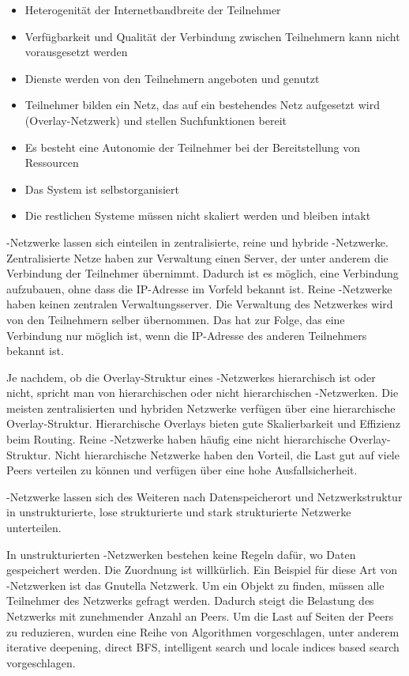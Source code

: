 \begin{itemize}
  \item Heterogenität der Internetbandbreite der Teilnehmer
  \item Verfügbarkeit und Qualität der Verbindung zwischen Teilnehmern kann nicht vorausgesetzt werden
  \item Dienste werden von den Teilnehmern angeboten und genutzt
  \item Teilnehmer bilden ein Netz, das auf ein bestehendes Netz aufgesetzt wird (Overlay-Netzwerk) und stellen Suchfunktionen bereit
  \item Es besteht eine Autonomie der Teilnehmer bei der Bereitstellung von Ressourcen
  \item Das System ist selbstorganisiert
  \item Die restlichen Systeme müssen nicht skaliert werden und bleiben intakt
\end{itemize}
\pTp-Netzwerke lassen sich einteilen in zentralisierte, reine und hybride \pTp-Netzwerke. Zentralisierte Netze haben zur Verwaltung einen Server, der unter anderem die Verbindung der Teilnehmer übernimmt. Dadurch ist es möglich, eine Verbindung aufzubauen, ohne dass die IP-Adresse im Vorfeld bekannt ist. Reine \pTp-Netzwerke haben keinen zentralen Verwaltungsserver. Die Verwaltung des Netzwerkes wird von den Teilnehmern selber übernommen. Das hat zur Folge, das eine Verbindung nur möglich ist, wenn die IP-Adresse des anderen Teilnehmers bekannt ist. 

Je nachdem, ob die Overlay-Struktur eines \pTp-Netzwerkes hierarchisch ist oder nicht, spricht man von hierarchischen oder nicht hierarchischen \pTp-Netzwerken. Die meisten zentralisierten und hybriden Netzwerke verfügen über eine hierarchische Overlay-Struktur. Hierarchische Overlays bieten gute Skalierbarkeit und Effizienz beim Routing. Reine \pTp-Netzwerke haben häufig eine nicht hierarchische Overlay-Struktur. Nicht hierarchische Netzwerke haben den Vorteil, die Last gut auf viele Peers verteilen zu können und verfügen über eine hohe Ausfallsicherheit.\cite{searchingsurvey}

\pTp-Netzwerke lassen sich des Weiteren nach Datenspeicherort und Netzwerkstruktur in unstrukturierte, lose strukturierte und stark strukturierte Netzwerke unterteilen. \cite{searchingsurvey}

In unstrukturierten \pTp-Netzwerken bestehen keine Regeln dafür, wo Daten gespeichert werden. Die Zuordnung ist willkürlich. Ein Beispiel für diese Art von \pTp-Netzwerken ist das Gnutella Netzwerk.\cite{gnutella} Um ein Objekt zu finden, müssen alle Teilnehmer des Netzwerks gefragt werden. Dadurch steigt die Belastung des Netzwerks mit zunehmender Anzahl an Peers. Um die Last auf Seiten der Peers zu reduzieren, wurden eine Reihe von Algorithmen vorgeschlagen, unter anderem iterative deepening\cite{deepening}, direct BFS\cite{deepening}, intelligent search\cite{intelligentSearch} und locale indices based search\cite{deepening} vorgeschlagen.

